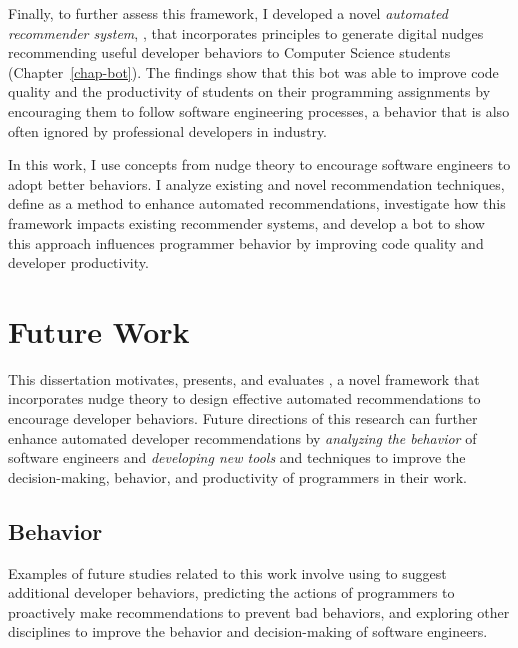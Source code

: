 Finally, to further assess this framework, I developed a novel \textit{automated recommender system}, \tooltwo, that incorporates \framework principles to generate digital nudges recommending useful developer behaviors to Computer Science students (Chapter~\ref{chap-bot}). The findings show that this bot was able to improve code quality and the productivity of students on their programming assignments by encouraging them to follow software engineering processes, a behavior that is also often ignored by professional developers in industry.

In this work, I use concepts from nudge theory to encourage software engineers to adopt better behaviors. I analyze existing and novel recommendation techniques, define \framework as a method to enhance automated recommendations, investigate how this framework impacts existing recommender systems, and develop a bot to show this approach influences programmer behavior by improving code quality and developer productivity.

\section{Future Work}

This dissertation motivates, presents, and evaluates \framework, a novel framework that incorporates nudge theory to design effective automated recommendations to encourage developer behaviors. Future directions of this research can further enhance automated developer recommendations by \textit{analyzing the behavior} of software engineers and \textit{developing new tools} and techniques to improve the decision-making, behavior, and productivity of programmers in their work.

\subsection{Behavior}

Examples of future studies related to this work involve using \framework to suggest additional developer behaviors, predicting the actions of programmers to proactively make recommendations to prevent bad behaviors, and exploring other disciplines to improve the behavior and decision-making of software engineers.

